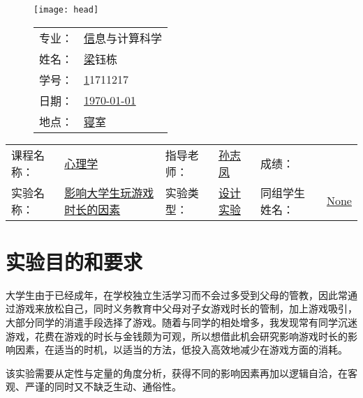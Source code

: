 \documentclass{zjureport}
\newcommand{\major}{信息与计算科学}
\newcommand{\name}{梁钰栋}
\newcommand{\stuid}{11711217}
\newcommand{\newdate}{\today}
\newcommand{\loc}{寝室}
\newcommand{\course}{心理学}
\newcommand{\tutor}{孙志凤}
\newcommand{\grades}{\phantom{100}}
\newcommand{\newtitle}{影响大学生玩游戏时长的因素}
\newcommand{\exptype}{设计实验}
\newcommand{\group}{None}
\begin{document}
\thispagestyle{empty}
\begin{figure}[h]
  \begin{minipage}{0.6\linewidth}
    \centerline{\texttt{[image: head]}}
  \end{minipage}
  \hfill
  \begin{minipage}{.4\linewidth}
    \raggedleft
    \begin{tabular*}{.8\linewidth}{ll}
      专业： & \underline\major   \\
      姓名： & \underline\name    \\
      学号： & \underline\stuid   \\
      日期： & \underline\newdate \\
      地点： & \underline\loc
    \end{tabular*}
  \end{minipage}
\end{figure}

\begin{table}[!htbp]
  \centering
  \begin{tabular*}{\linewidth}{llllll}
    课程名称： & \underline{\course\phantom{\newtitle}} & 指导老师： & \underline{\tutor\phantom{\exptype}} & 成绩：       & \underline{\grades\phantom{\group}} \\
    实验名称： & \underline{\newtitle\phantom{\course}} & 实验类型： & \underline{\exptype\phantom{\tutor}} & 同组学生姓名：& \underline{\group\phantom{\grades}}
  \end{tabular*}
\end{table}


\section{实验目的和要求}
  大学生由于已经成年，在学校独立生活学习而不会过多受到父母的管教，因此常通过游戏来放松自己，同时义务教育中父母对子女游戏时长的管制，加上游戏吸引，大部分同学的消遣手段选择了游戏。随着与同学的相处增多，我发现常有同学沉迷游戏，花费在游戏的时长与金钱颇为可观，所以想借此机会研究影响游戏时长的影响因素，在适当的时机，以适当的方法，低投入高效地减少在游戏方面的消耗。
  
  该实验需要从定性与定量的角度分析，获得不同的影响因素再加以逻辑自洽，在客观、严谨的同时又不缺乏生动、通俗性。
\end{document}
